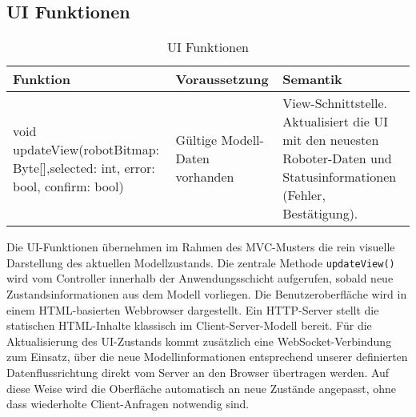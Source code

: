 \clearpage
\subsection{UI Funktionen}
\begin{table}[h!]
    \centering
    \begin{tabular}{|p{5cm}|p{5cm}|p{5cm}|}
        \hline
        \textbf{Funktion} & \textbf{Voraussetzung} & \textbf{Semantik} \\
        \hline
        void updateView(robotBitmap: Byte[],selected: int, error: bool, confirm: bool) & Gültige Modell-Daten vorhanden & View-Schnittstelle. Aktualisiert die UI mit den neuesten Roboter-Daten und Statusinformationen (Fehler, Bestätigung). \\ 
        \hline
    \end{tabular}
    \caption{UI Funktionen}
    \label{tab:UIFunktionen}
\end{table}


Die UI-Funktionen übernehmen im Rahmen des MVC-Musters die rein visuelle Darstellung des aktuellen Modellzustands. 
Die zentrale Methode \texttt{updateView()} wird vom Controller innerhalb der Anwendungsschicht aufgerufen, sobald neue Zustandsinformationen aus dem Modell vorliegen. 
Die Benutzeroberfläche wird in einem HTML-basierten Webbrowser dargestellt. 
Ein HTTP-Server stellt die statischen HTML-Inhalte klassisch im Client-Server-Modell bereit. 
Für die Aktualisierung des UI-Zustands kommt zusätzlich eine WebSocket-Verbindung zum Einsatz, über die neue Modellinformationen entsprechend unserer definierten Datenflussrichtung direkt vom Server an den Browser übertragen werden. 
Auf diese Weise wird die Oberfläche automatisch an neue Zustände angepasst, ohne dass wiederholte Client-Anfragen notwendig sind.


